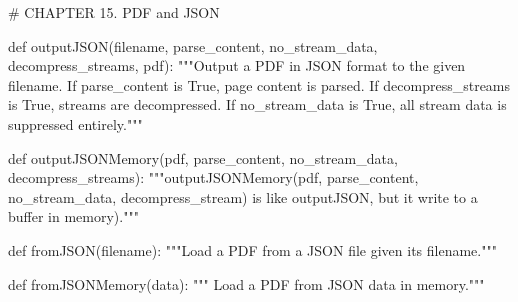 # CHAPTER 15. PDF and JSON

def outputJSON(filename, parse_content, no_stream_data, decompress_streams, pdf):
    """Output a PDF in JSON format to the given filename. If parse_content is
    True, page content is parsed. If decompress_streams is True, streams are
    decompressed. If no_stream_data is True, all stream data is suppressed
    entirely."""

def outputJSONMemory(pdf, parse_content, no_stream_data, decompress_streams):
    """outputJSONMemory(pdf, parse_content, no_stream_data, decompress_stream)
    is like outputJSON, but it write to a buffer in memory)."""

def fromJSON(filename):
    """Load a PDF from a JSON file given its filename."""

def fromJSONMemory(data):
    """ Load a PDF from JSON data in memory."""
